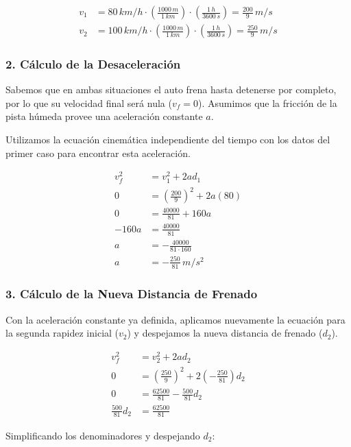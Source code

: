 \documentclass[12pt, a4paper]{article}
\begin{document}
\begin{align*}
v_1 &= 80 \, \si{km/h} \cdot \left( \frac{1000 \, \si{m}}{1 \, \si{km}} \right) \cdot \left( \frac{1 \, \si{h}}{3600 \, \si{s}} \right) = \frac{200}{9} \, \si{m/s} \\
v_2 &= 100 \, \si{km/h} \cdot \left( \frac{1000 \, \si{m}}{1 \, \si{km}} \right) \cdot \left( \frac{1 \, \si{h}}{3600 \, \si{s}} \right) = \frac{250}{9} \, \si{m/s}
\end{align*}

\subsubsection*{2. Cálculo de la Desaceleración}
Sabemos que en ambas situaciones el auto frena hasta detenerse por completo, por lo que su velocidad final será nula ($v_f = 0$). Asumimos que la fricción de la pista húmeda provee una aceleración constante $a$. 

Utilizamos la ecuación cinemática independiente del tiempo con los datos del primer caso para encontrar esta aceleración.

\begin{align*}
v_f^2 &= v_1^2 + 2 a d_1 \\
0 &= \left( \frac{200}{9} \right)^2 + 2 a (80) \\
0 &= \frac{40000}{81} + 160 a \\
-160 a &= \frac{40000}{81} \\
a &= -\frac{40000}{81 \cdot 160} \\
a &= -\frac{250}{81} \, \si{m/s^2}
\end{align*}

\subsubsection*{3. Cálculo de la Nueva Distancia de Frenado}
Con la aceleración constante ya definida, aplicamos nuevamente la ecuación para la segunda rapidez inicial ($v_2$) y despejamos la nueva distancia de frenado ($d_2$).

\begin{align*}
v_f^2 &= v_2^2 + 2 a d_2 \\
0 &= \left( \frac{250}{9} \right)^2 + 2 \left( -\frac{250}{81} \right) d_2 \\
0 &= \frac{62500}{81} - \frac{500}{81} d_2 \\
\frac{500}{81} d_2 &= \frac{62500}{81}
\end{align*}

Simplificando los denominadores y despejando $d_2$:
\end{document}
